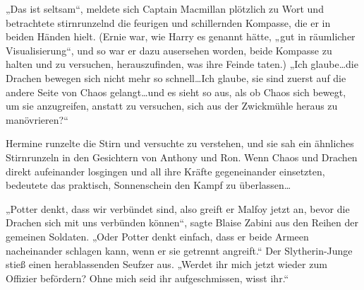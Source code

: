 „Das ist seltsam“, meldete sich Captain Macmillan plötzlich zu Wort und betrachtete stirnrunzelnd die feurigen und schillernden Kompasse, die er in beiden Händen hielt. (Ernie war, wie Harry es genannt hätte, „gut in räumlicher Visualisierung“, und so war er dazu ausersehen worden, beide Kompasse zu halten und zu versuchen, herauszufinden, was ihre Feinde taten.) „Ich glaube…die Drachen bewegen sich nicht mehr so schnell…Ich glaube, sie sind zuerst auf die andere Seite von Chaos gelangt…und es sieht so aus, als ob Chaos sich bewegt, um sie anzugreifen, anstatt zu versuchen, sich aus der Zwickmühle heraus zu manövrieren?“

Hermine runzelte die Stirn und versuchte zu verstehen, und sie sah ein ähnliches Stirnrunzeln in den Gesichtern von Anthony und Ron. Wenn Chaos und Drachen direkt aufeinander losgingen und all ihre Kräfte gegeneinander einsetzten, bedeutete das praktisch, Sonnenschein den Kampf zu überlassen…

„Potter denkt, dass wir verbündet sind, also greift er Malfoy jetzt an, bevor die Drachen sich mit uns verbünden können“, sagte Blaise Zabini aus den Reihen der gemeinen Soldaten. „Oder Potter denkt einfach, dass er beide Armeen nacheinander schlagen kann, wenn er sie getrennt angreift.“ Der Slytherin-Junge stieß einen herablassenden Seufzer aus. „Werdet ihr mich jetzt wieder zum Offizier befördern? Ohne mich seid ihr aufgeschmissen, wisst ihr.“


